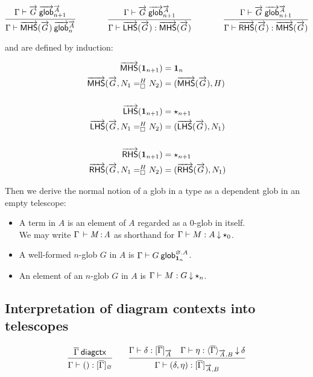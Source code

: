 \[
\infer
  {\wfglob{\Gamma}{\mhs{\tel G}}{\tel A}n}
  {\wfglob{\Gamma}{\tel G}{\tel A}{n+1}}
\qquad\qquad
\infer
  {\ofglob{\Gamma}{\lhs{\tel G}}{\mhs{\tel G}}}
  {\wfglob{\Gamma}{\tel G}{\tel A}{n+1}}
\qquad\qquad
\infer
  {\ofglob{\Gamma}{\rhs{\tel G}}{\mhs{\tel G}}}
  {\wfglob{\Gamma}{\tel G}{\tel A}{n+1}}
\]

and are defined by induction:

\[\begin{aligned}
\mhs{\unitglob{n+1}} &= \unitglob n \\
\mhs{\tel G,\dhomj{H}{N_1}{N_2}{\blank}} &= (\mhs{\tel G},H) \\
&\\
\lhs{\unitglob{n+1}} &= \unitglobelt{n+1} \\
\lhs{\tel G,\dhomj{H}{N_1}{N_2}{\blank}} &= (\lhs{\tel G},N_1) \\
&\\
\rhs{\unitglob{n+1}} &= \unitglobelt{n+1} \\
\rhs{\tel G,\dhomj{H}{N_1}{N_2}{\blank}} &= (\rhs{\tel G},N_1)
\end{aligned}\]

Then we derive the normal notion of a glob in a type as a dependent glob in an
empty telescope:
\begin{itemize}
\item A term in $A$ is an element of $A$ regarded as a $0$-glob in itself. \\
We may write $\oftp{\Gamma}{M}{A}$ as shorthand for
$\ofdepglob{\Gamma}{M}{A}{\unitglobelt 0}$.

\item A well-formed $n$-glob $G$ in $A$ is 
$\wfdepglob{\Gamma}{G}{\emptyctx.A}{\unitglob n}$.

\item An element of an $n$-glob $G$ in $A$ is
$\ofdepglob{\Gamma}{M}{G}{\unitglobelt n}$.
\end{itemize}

\subsection{Interpretation of diagram contexts into telescopes}

\begin{small}
\[\infer
    {\ofinterp{\Gamma}{()}{\diag\Gamma}{\emptytel}}
    {\wfdiagctx{\diag\Gamma}}
  \qquad
  \infer
    {\ofinterp{\Gamma}{(\delta,\eta)}{\diag\Gamma}{\tel A,B}}
    {\ofinterp{\Gamma}{\delta}{\diag\Gamma}{\tel A}
    &\ofinterpdep{\Gamma}{\eta}{\diag\Gamma}{\tel A.B}{\delta}}
\]
\end{small}

